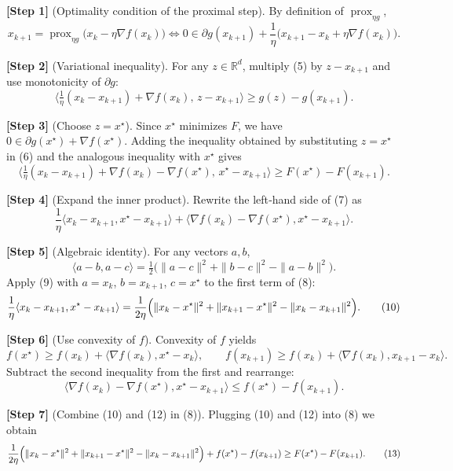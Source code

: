 \documentclass{article}
\newcommand{\prox}{\operatorname{prox}}
\newcommand{\R}{\mathbb{R}}
\begin{document}
\noindent\textbf{[Step 1]} (Optimality condition of the proximal step).  
By definition of $\prox_{\eta g}$,
\[
x_{k+1}= \prox_{\eta g}\bigl(x_{k}-\eta\nabla f(x_{k})\bigr)
\Longleftrightarrow
0\in\partial g(x_{k+1})+\frac{1}{\eta}\bigl(x_{k+1}-x_{k}+\eta\nabla f(x_{k})\bigr).
\tag{5}
\]

\noindent\textbf{[Step 2]} (Variational inequality).  
For any $z\in\R^{d}$, multiply (5) by $z-x_{k+1}$ and use monotonicity of $\partial g$:
\[
\big\langle \tfrac{1}{\eta}(x_{k}-x_{k+1})+\nabla f(x_{k}),\,z-x_{k+1}\big\rangle
\ge g(z)-g(x_{k+1}).
\tag{6}
\]

\noindent\textbf{[Step 3]} (Choose $z=x^{\star}$).  
Since $x^{\star}$ minimizes $F$, we have $0\in\partial g(x^{\star})+\nabla f(x^{\star})$. Adding the inequality obtained by substituting $z=x^{\star}$ in (6) and the analogous inequality with $x^{\star}$ gives
\[
\big\langle \tfrac{1}{\eta}(x_{k}-x_{k+1})+\nabla f(x_{k})-\nabla f(x^{\star}),\,x^{\star}-x_{k+1}\big\rangle
\ge F(x^{\star})-F(x_{k+1}).
\tag{7}
\]

\noindent\textbf{[Step 4]} (Expand the inner product).  
Rewrite the left‑hand side of (7) as
\[
\frac{1}{\eta}\langle x_{k}-x_{k+1},x^{\star}-x_{k+1}\rangle
+\langle\nabla f(x_{k})-\nabla f(x^{\star}),x^{\star}-x_{k+1}\rangle .
\tag{8}
\]

\noindent\textbf{[Step 5]} (Algebraic identity).  
For any vectors $a,b$,
\[
\langle a-b,a-c\rangle=\tfrac12\bigl(\|a-c\|^{2}+\|b-c\|^{2}-\|a-b\|^{2}\bigr).
\tag{9}
\]
Apply (9) with $a=x_{k}$, $b=x_{k+1}$, $c=x^{\star}$ to the first term of (8):
\[
\frac{1}{\eta}\langle x_{k}-x_{k+1},x^{\star}-x_{k+1}\rangle
=\frac{1}{2\eta}\Bigl(\|x_{k}-x^{\star}\|^{2}
+\|x_{k+1}-x^{\star}\|^{2}
-\|x_{k}-x_{k+1}\|^{2}\Bigr).
\tag{10}
\]

\noindent\textbf{[Step 6]} (Use convexity of $f$).  
Convexity of $f$ yields
\[
f(x^{\star})\ge f(x_{k})+\langle\nabla f(x_{k}),x^{\star}-x_{k}\rangle,
\qquad
f(x_{k+1})\ge f(x_{k})+\langle\nabla f(x_{k}),x_{k+1}-x_{k}\rangle.
\tag{11}
\]
Subtract the second inequality from the first and rearrange:
\[
\langle\nabla f(x_{k})-\nabla f(x^{\star}),x^{\star}-x_{k+1}\rangle
\le f(x^{\star})-f(x_{k+1}) .
\tag{12}
\]

\noindent\textbf{[Step 7]} (Combine (10) and (12) in (8)).  
Plugging (10) and (12) into (8) we obtain
\[
\frac{1}{2\eta}\Bigl(\|x_{k}-x^{\star}\|^{2}
+\|x_{k+1}-x^{\star}\|^{2}
-\|x_{k}-x_{k+1}\|^{2}\Bigr)
+f(x^{\star})-f(x_{k+1})
\ge F(x^{\star})-F(x_{k+1}).
\tag{13}
\]
\end{document}
